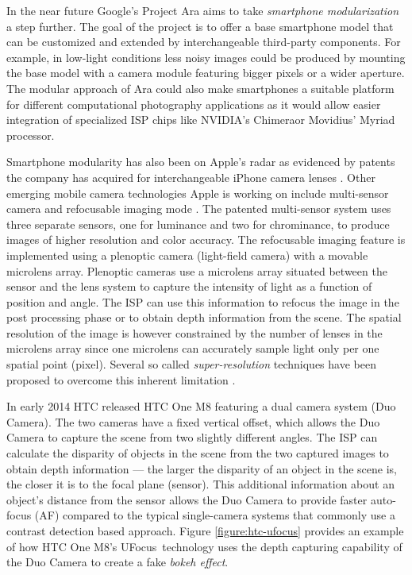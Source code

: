 \documentclass[thesis.tex]{subfiles}
\begin{document}
In the near future Google's Project Ara aims to take \textit{smartphone modularization} a step further. The goal of the project is to offer a base smartphone model that can be customized and extended by interchangeable third-party components. For example, in low-light conditions less noisy images could be produced by mounting the base model with a camera module featuring bigger pixels or a wider aperture. The modular approach of Ara could also make smartphones a suitable platform for different computational photography applications as it would allow easier integration of specialized ISP chips like NVIDIA's Chimera\texttrademark or Movidius' Myriad processor.

Smartphone modularity has also been on Apple's radar as evidenced by patents the company has acquired for interchangeable iPhone camera lenses \cite{apple_patent_camera_module_3}\cite{apple_patent_camera_module_4}\cite{apple_patent_camera_module_5}. Other emerging mobile camera technologies Apple is working on include multi-sensor camera and refocusable imaging mode \cite{apple_patent_camera_module_1}\cite{apple_patent_camera_module_2}. The patented multi-sensor system uses three separate sensors, one for luminance and two for chrominance, to produce images of higher resolution and color accuracy. The refocusable imaging feature is implemented using a plenoptic camera (light-field camera) with a movable microlens array. Plenoptic cameras use a microlens array situated between the sensor and the lens system to capture the intensity of light as a function of position and angle. The ISP can use this information to refocus the image in the post processing phase or to obtain depth information from the scene. The spatial resolution of the image is however constrained by the number of lenses in the microlens array since one microlens can accurately sample light only per one spatial point (pixel). Several so called \textit{super-resolution} techniques have been proposed to overcome this inherent limitation \cite{plenoptic_1}\cite{plenoptic_2}\cite{plenoptic_3}.

In early 2014 HTC released HTC One M8 featuring a dual camera system (Duo Camera). The two cameras have a fixed vertical offset, which allows the Duo Camera to capture the scene from two slightly different angles. The ISP can calculate the disparity of objects in the scene from the two captured images to obtain depth information --- the larger the disparity of an object in the scene is, the closer it is to the focal plane (sensor). This additional information about an object's distance from the sensor allows the Duo Camera to provide faster auto-focus (AF) compared to the typical single-camera systems that commonly use a contrast detection based approach. Figure \ref{figure:htc-ufocus} provides an example of how HTC One M8's UFocus\texttrademark\ technology uses the depth capturing capability of the Duo Camera to create a fake \emph{bokeh effect}.
\end{document}

